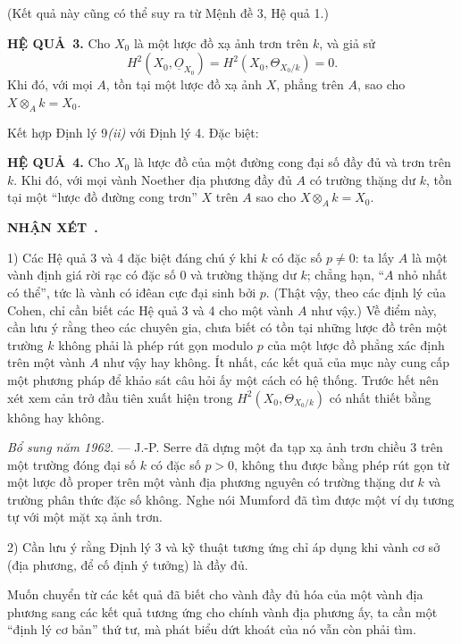 \documentclass[11pt,twoside,openany]{book}
\numberwithin{equation}{section}
\newcommand{\Osh}{\underline{O}}
\newcommand{\result}[2]{\par\medskip\noindent\textbf{#1\if\relax\detokenize{#2}\relax\else\ #2\fi.}\quad}
\begin{document}
(Kết quả này cũng có thể suy ra từ Mệnh đề 3, Hệ quả 1.)

\result{HỆ QUẢ}{3} Cho $X_0$ là một lược đồ xạ ảnh trơn trên $k$, và giả sử
\[
  H^2(X_0,\Osh_{X_0})=H^2(X_0,\Theta_{X_0/k})=0.
\]
Khi đó, với mọi $A$, tồn tại một lược đồ xạ ảnh $X$, phẳng trên $A$, sao cho
$X\otimes_A k=X_0$.

Kết hợp Định lý 9\textit{(ii)} với Định lý 4. Đặc biệt:

\result{HỆ QUẢ}{4} Cho $X_0$ là lược đồ của một đường cong đại số đầy đủ và
trơn trên $k$. Khi đó, với mọi vành Noether địa phương đầy đủ $A$ có trường
thặng dư $k$, tồn tại một “lược đồ đường cong trơn” $X$ trên $A$ sao cho
$X\otimes_A k=X_0$.

\result{NHẬN XÉT}{}

1) Các Hệ quả 3 và 4 đặc biệt đáng chú ý khi $k$ có đặc số $p\ne0$: ta lấy
$A$ là một vành định giá rời rạc có đặc số $0$ và trường thặng dư $k$; chẳng
hạn, “$A$ nhỏ nhất có thể”, tức là vành có iđêan cực đại sinh bởi $p$. (Thật
vậy, theo các định lý của Cohen, chỉ cần biết các Hệ quả 3 và 4 cho một vành
$A$ như vậy.) Về điểm này, cần lưu ý rằng theo các chuyên gia, chưa biết có
tồn tại những lược đồ trên một trường $k$ không phải là phép rút gọn modulo
$p$ của một lược đồ phẳng xác định trên một vành $A$ như vậy hay không. Ít
nhất, các kết quả của mục này cung cấp một phương pháp để khảo sát câu hỏi ấy
một cách có hệ thống. Trước hết nên xét xem cản trở đầu tiên xuất hiện trong
$H^2(X_0,\Theta_{X_0/k})$ có nhất thiết bằng không hay không.

\emph{Bổ sung năm 1962.} --- J.-P. Serre đã dựng một đa tạp xạ ảnh trơn chiều
3 trên một trường đóng đại số $k$ có đặc số $p>0$, không thu được bằng phép
rút gọn từ một lược đồ proper trên một vành địa phương nguyên có trường thặng
dư $k$ và trường phân thức đặc số không. Nghe nói Mumford đã tìm được một ví
dụ tương tự với một mặt xạ ảnh trơn.

2) Cần lưu ý rằng Định lý 3 và kỹ thuật tương ứng chỉ áp dụng khi vành cơ sở
(địa phương, để cố định ý tưởng) là đầy đủ.

Muốn chuyển từ các kết quả đã biết cho vành đầy đủ hóa của một vành địa phương
sang các kết quả tương ứng cho chính vành địa phương ấy, ta cần một “định lý
cơ bản” thứ tư, mà phát biểu dứt khoát của nó vẫn còn phải tìm.
\end{document}
